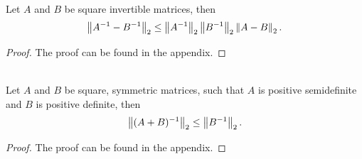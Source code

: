 \documentclass[10pt]{article}
\begin{document}
\begin{lemma}
\label{lemma_difference_inverse}
\leavevmode \\
Let $A$ and $B$ be square invertible matrices, then
\begin{equation*}
\left\|A^{-1} - B^{-1}\right\|_2 \le \left\|A^{-1}\right\|_2 \left\|B^{-1}\right\|_2 \left\|A - B\right\|_2.
\end{equation*}
\end{lemma}
\begin{proof}
The proof can be found in the appendix.
\end{proof}

\begin{lemma}
\label{lemma_inverse_sum}
\leavevmode \\
Let $A$ and $B$ be square, symmetric matrices, such that $A$ is positive semidefinite and $B$ is positive definite, then
\[ \left\|(A + B)^{-1}\right\|_2 \le \left\|B^{-1}\right\|_2. \]
\end{lemma}
\begin{proof}
The proof can be found in the appendix.
\end{proof}
\end{document}

